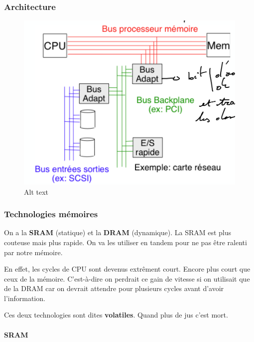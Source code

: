 \subsubsection{Architecture}\label{architecture}

\begin{figure}
\centering
\includegraphics{image-7.png}
\caption{Alt text}
\end{figure}

\subsubsection{Technologies mémoires}\label{technologies-muxe9moires}

On a la \textbf{SRAM} (statique) et la \textbf{DRAM} (dynamique). La
SRAM est plus couteuse mais plus rapide. On va les utiliser en tandem
pour ne pas être ralenti par notre mémoire.

En effet, les cycles de CPU sont devenus extrêment court. Encore plus
court que ceux de la mémoire. C'est-à-dire on perdrait ce gain de
vitesse si on utilisait que de la DRAM car on devrait attendre pour
plusieurs cycles avant d'avoir l'information.

Ces deux technologies sont dites \textbf{volatiles}. Quand plus de jus
c'est mort.

\paragraph{SRAM}\label{sram}

